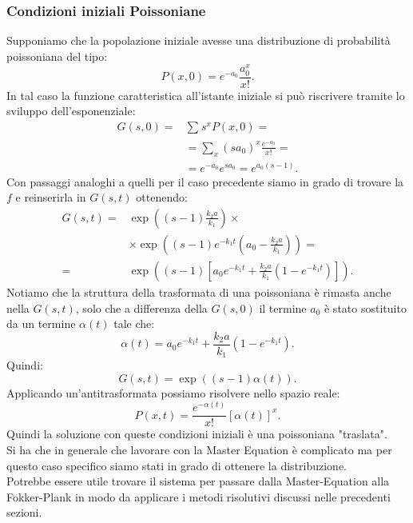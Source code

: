 \subsubsection{Condizioni iniziali Poissoniane}%
\label{subsub:Condizioni iniziali Poissoniane}
Supponiamo che la popolazione iniziale avesse una distribuzione di probabilità poissoniana del tipo:
\[
    P(x,0) = e^{-a_0}\frac{a_0^x}{x!}
.\] 
In tal caso la funzione caratteristica all'istante iniziale si può riscrivere tramite lo sviluppo dell'esponenziale:
\[\begin{aligned}
    G(s,0) =& \sum_{}^{} s^xP(x,0) =\\
	    & = \sum_{x}^{} (sa_0) ^x \frac{e^{-a_0}}{x!} =\\
	    & = e^{-a_0}e^{sa_0} = e^{a_0(s-1) }
.\end{aligned}\]
Con passaggi analoghi a quelli per il caso precedente siamo in grado di trovare la $f$  e reinserirla in $G(s,t)$  ottenendo:
\[\begin{aligned}
    G(s,t) =& \exp\left((s-1) \frac{k_2a}{k_1}\right)\times  \\
	    &\times  \exp\left((s-1)e^{-k_1t}\left(a_0- \frac{k_2a}{k_1}\right)\right)=\\
           =& \exp\left((s-1) \left[a_0 e^{-k_1t} + \frac{k_2a}{k_1}(1-e^{-k_1t})\right]\right)
.\end{aligned}\]
Notiamo che la struttura della trasformata di una poissoniana è rimasta anche nella $G(s,t)$, solo che a differenza della $G(s,0)$  il termine $a_0$  è stato sostituito da un termine $\alpha (t) $  tale che:
\[
    \alpha (t) = a_0 e^{-k_1t} + \frac{k_2a}{k_1}(1-e^{-k_1t})
.\] 
Quindi:
\[
    G(s,t) = \exp\left((s-1) \alpha (t) \right)
.\] 
Applicando un'antitrasformata possiamo risolvere nello spazio reale:
\[
    P(x,t) = \frac{e^{-\alpha (t)}}{x!}\left[\alpha (t) \right]^x
.\] 
Quindi la soluzione con queste condizioni iniziali è una poissoniana "traslata".\\
Si ha che in generale che lavorare con la Master Equation è complicato ma per questo caso specifico siamo stati in grado di ottenere la distribuzione.\\
Potrebbe essere utile trovare il sistema per passare dalla Master-Equation alla Fokker-Plank in modo da applicare i metodi risolutivi discussi nelle precedenti sezioni.
\clearpage
